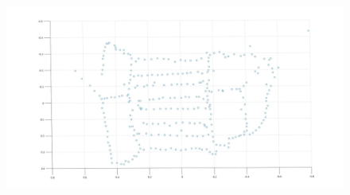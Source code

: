 \documentclass{article}
\begin{document}
\begin{figure}[H]
    \centering
    \includegraphics[width=6.5in]{./figures/q2_7_3}
\end{figure}
\end{document}
